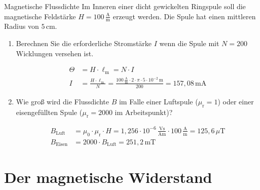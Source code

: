 \begin{frame} 
	\begin{bsp}{Magnetische Flussdichte}{}
		Im Inneren einer dicht gewickelten Ringspule soll die magnetische Feldstärke $H=100\,\frac{\mathrm{A}}{\mathrm{m}}$ erzeugt werden. Die Spule hat einen mittleren Radius von $5\,\mathrm{cm}$.
		\begin{enumerate}
			\item Berechnen Sie die erforderliche Stromstärke $I$ wenn die Spule mit $N=200$ Wicklungen versehen ist.\pause
			      
			      \begin{align*}
				      \varTheta & = H \cdot \ell_{\mathrm{m}} = N\cdot I                                                                                                                  \\
				      I         & =\frac{H\cdot\ell_{\mathrm{m}}}{N}=\frac{100\,\frac{\mathrm{A}}{\mathrm{m}}\cdot 2\cdot \pi\cdot 5\cdot 10^{-2}\,\mathrm{m}}{200} = 157,08\,\mathrm{mA}
			      \end{align*}\pause
			\item Wie groß wird die Flussdichte $B$ im Falle einer Luftspule ($\mu_{\mathrm{r}}=1$) oder einer eisengefüllten Spule ($\mu_{\mathrm{r}}=2000$ im Arbeitspunkt)?\pause
			      
			      \begin{align*}
				      B_\mathrm{Luft}  & = \mu_0\cdot \mu_{\mathrm{r}}\cdot H = 1,256\cdot10^{-6}\,\tfrac{\mathrm{Vs}}{\mathrm{Am}} \cdot 100\,\tfrac{\mathrm{A}}{\mathrm{m}} = 125,6\,\mu\mathrm{T} \\
				      B_\mathrm{Eisen} & = 2000\cdot B_\mathrm{Luft} = 251,2\,\mathrm{mT}
			      \end{align*}
		\end{enumerate}
	\end{bsp}
\end{frame}

\section{Der magnetische Widerstand}

